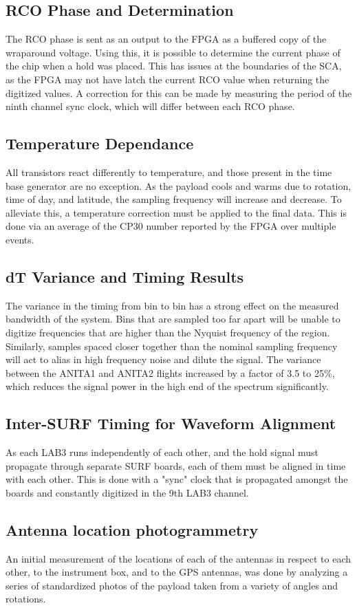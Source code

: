 	\subsection{RCO Phase and Determination}
		The RCO phase is sent as an output to the FPGA as a buffered copy of the wraparound voltage.  Using this, it is possible to determine the current phase of the chip when a hold was placed.  This has issues at the boundaries of the SCA, as the FPGA may not have latch the current RCO value when returning the digitized values.  A correction for this can be made by measuring the period of the ninth channel sync clock, which will differ between each RCO phase.
	\subsection{Temperature Dependance}
		All transistors react differently to temperature, and those present in the time base generator are no exception.  As the payload cools and warms due to rotation, time of day, and latitude, the sampling frequency will increase and decrease.  To alleviate this, a temperature correction must be applied to the final data. This is done via an average of the CP30 number reported by the FPGA over multiple events.
	\subsection{dT Variance and Timing Results}
		The variance in the timing from bin to bin has a strong effect on the measured bandwidth of the system.  Bins that are sampled too far apart will be unable to digitize frequencies that are higher than the Nyquist frequency of the region.  Similarly, samples spaced closer together than the nominal sampling frequency will act to alias in high frequency noise and dilute the signal.  The variance between the ANITA1 and ANITA2 flights increased by a factor of 3.5 to 25\%, which reduces the signal power in the high end of the spectrum significantly.
	\subsection{Inter-SURF Timing for Waveform Alignment}
		As each LAB3 runs independently of each other, and the hold signal must propagate through separate SURF boards, each of them must be aligned in time with each other.  This is done with a "sync" clock that is propagated amongst the boards and constantly digitized in the 9th LAB3 channel.

	\subsection{Antenna location photogrammetry}
		An initial measurement of the locations of each of the antennas in respect to each other, to the instrument box, and to the GPS antennas, was done by analyzing a series of standardized photos of the payload taken from a variety of angles and rotations.
		
